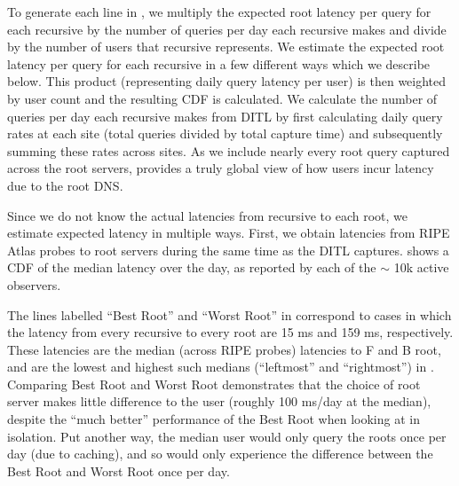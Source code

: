 \documentclass[sigconf,letterpaper,nonacm,10pt,anonymous]{acmart}
\begin{document}
To generate each line in , we
multiply the expected root latency per query for each recursive by the
number of queries per day each recursive makes and divide by the number
of users that recursive represents. We estimate the expected root
latency per query for each recursive in a few different ways which we
describe below. This product (representing daily query latency per user)
is then weighted by user count and the resulting CDF is calculated. We
calculate the number of queries per day each recursive makes from DITL
by first calculating daily query rates at each site (\ie total queries
divided by total capture time) and subsequently summing these rates
across sites. As we include nearly every root query captured across the
root servers,  provides a truly
global view of how users incur latency due to the root DNS.

Since we do not know the actual latencies from recursive to each root,
we estimate expected latency in multiple ways. First, we obtain
latencies from RIPE Atlas probes to root servers during the same time as
the DITL captures.  shows a CDF of the
median latency over the day, as reported by each of the \(\sim\) 10k
active observers.

The lines labelled ``Best Root'' and ``Worst Root'' in
 correspond to cases in which the
latency from every recursive to every root are 15 ms and 159 ms,
respectively. These latencies are the median (across RIPE probes)
latencies to F and B root, and are the lowest and highest such medians
(\ie ``leftmost'' and ``rightmost'') in .
Comparing Best Root and Worst Root demonstrates that the choice of root
server makes little difference to the user (roughly 100 ms/day at the
median), despite the ``much better'' performance of the Best Root when
looking at  in isolation. Put another way,
the median user would only query the roots once per day (due to
caching), and so would only experience the difference between the Best
Root and Worst Root once per day.
\end{document}
